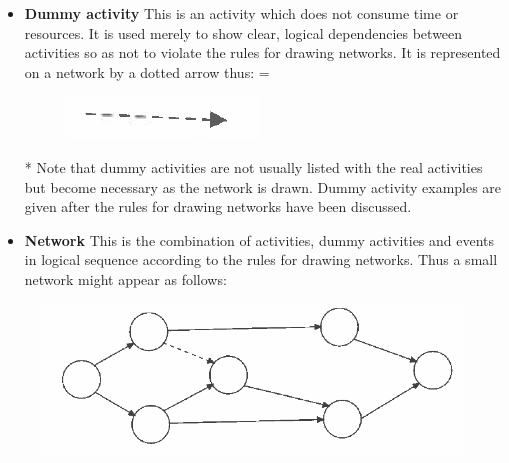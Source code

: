 \documentclass[]{report}
\begin{document}
\begin{itemize}
\item \textbf{Dummy activity} This is an activity which does not consume time or resources. It is used merely to show clear, logical dependencies between activities so as not to violate the rules for drawing networks. It is represented on a network by a dotted arrow thus: =
\begin{figure}[h!]
\centering
\includegraphics[width=0.1\linewidth]{323-c}
\end{figure}
 * Note that dummy activities are not usually listed with the real activities but become necessary as the network is drawn. Dummy activity examples are given after the rules for drawing networks have been discussed. 
\item \textbf{Network} This is the combination of activities, dummy activities and events in logical sequence according to the rules for drawing networks. Thus a small network might appear as follows: 

\end{itemize}
\begin{figure}
\centering
\includegraphics[width=0.4\linewidth]{324-a}
\caption{}
\label{fig:324-a}
\end{figure}


\newpage
\end{document}
